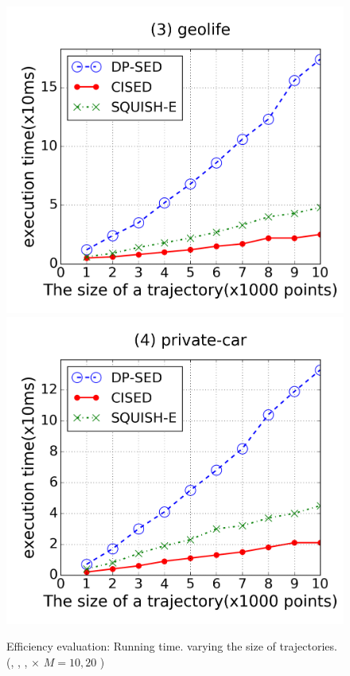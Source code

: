 \begin{figure}[tb!]
\includegraphics[scale = 0.250]{figures/Exp-time-size-geolife.png}
\includegraphics[scale = 0.250]{figures/Exp-time-size-private.png}
\vspace{-3ex}
\caption{\small Efficiency evaluation: Running time. varying the size of trajectories. (\cist, \cista, \dpa, \squishe  $\times$ $M = 10, {20}$ )}
\label{fig:time-size}
\vspace{-1ex}
\end{figure}

